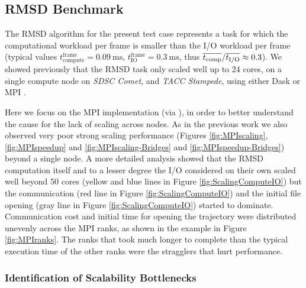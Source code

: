 \label{impl_exp}

\subsection{RMSD Benchmark}
\label{sec:RMSD}
The RMSD algorithm for the present test case represents a task for which the computational workload per frame is smaller than the I/O workload per frame (typical values $t_{\text{compute}}^{\text{frame}} = 0.09\ \text{ms}$, $t_{\text{IO}}^{\text{frame}} = 0.3\ \text{ms}$, thus $\overline{{t}_{\text{comp}}}/\overline{{t}_{\text{I/O}}} \approx 0.3$). 
We showed previously that the RMSD task only scaled well up to 24 cores, on a single compute node on \emph{SDSC Comet}, and \emph{TACC Stampede}, using either Dask or MPI \cite{Khoshlessan:2017ab}.

Here we focus on the MPI implementation (via  \cite{Dalcin:2011aa, Dalcin:2005aa}), in order to better understand the cause for the lack of scaling across nodes.
As in the previous work we also observed very poor strong scaling performance (Figures \ref{fig:MPIscaling}, \ref{fig:MPIspeedup} and \ref{fig:MPIscaling-Bridges} and \ref{fig:MPIspeedup-Bridges}) beyond a single node.
A more detailed analysis showed that the RMSD computation itself and to a lesser degree the I/O considered on their own scaled well beyond 50 cores (yellow and blue lines in Figure \ref{fig:ScalingComputeIO}) but the communication (red line in Figure \ref{fig:ScalingComputeIO}) and the initial file opening (gray line in Figure \ref{fig:ScalingComputeIO}) started to dominate.
Communication cost and initial time for opening the trajectory were distributed unevenly across the MPI ranks, as shown in the example in Figure \ref{fig:MPIranks}. 
The ranks that took much longer to complete than the typical execution time of the other ranks were the stragglers that hurt performance.

\subsubsection*{Identification of Scalability Bottlenecks}

